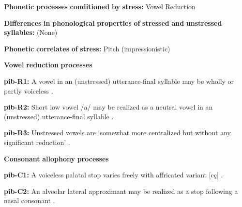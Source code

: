 \begin{styleBody}
\textbf{Phonetic} \textbf{processes} \textbf{conditioned} \textbf{by} \textbf{stress:} Vowel Reduction
\end{styleBody}

\begin{styleBody}
\textbf{Differences} \textbf{in} \textbf{phonological} \textbf{properties} \textbf{of} \textbf{stressed} \textbf{and} \textbf{unstressed} \textbf{syllables:} (None)
\end{styleBody}

\begin{styleBody}
\textbf{Phonetic} \textbf{correlates} \textbf{of} \textbf{stress:} Pitch (impressionistic)
\end{styleBody}

\begin{styleBody}
\textbf{Vowel} \textbf{reduction} \textbf{processes}
\end{styleBody}

\begin{styleBody}
\textbf{pib-R1:} A vowel in an (unstressed) utterance-final syllable may be wholly or partly voiceless \citep[23]{Matteson1965}.
\end{styleBody}

\begin{styleBody}
\textbf{pib-R2:} Short low vowel /a/ may be realized as a neutral vowel in an (unstressed) utterance-final syllable \citep[23]{Matteson1965}.
\end{styleBody}

\begin{styleBody}
\textbf{pib-R3:} Unstressed vowels are ‘somewhat more centralized but without any significant reduction’ \citep[16]{Hanson2010}.
\end{styleBody}

\begin{styleBody}
\textbf{Consonant} \textbf{allophony} \textbf{processes}
\end{styleBody}

\begin{styleBody}
\textbf{pib-C1:} A voiceless palatal stop varies freely with affricated variant [cç] \citep[17]{Hanson2010}.
\end{styleBody}

\begin{styleBody}
\textbf{pib-C2:} An alveolar lateral approximant may be realized as a stop following a nasal consonant \citep[24]{Hanson2010}.
\end{styleBody}

